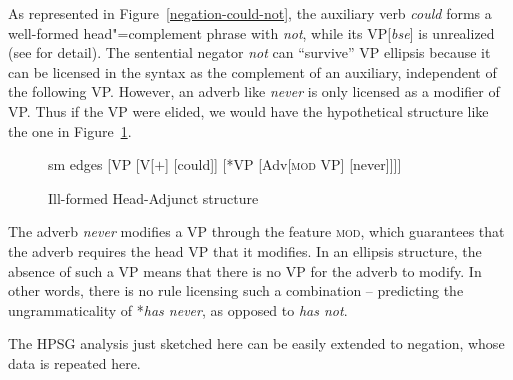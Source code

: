 \documentclass[output=paper,biblatex,babelshorthands,newtxmath,draftmode,colorlinks,citecolor=brown]{langscibook}
\begin{document}
\begin{exe}
\begin{xlist}
\begin{exe}
\begin{xlist}
As represented in Figure~\ref{negation-could-not}, the auxiliary verb \textit{could} forms a well-formed head"=complement phrase with \textit{not}, while its
VP[\textit{bse}] is unrealized (see \citealt{Kim:00, KS:08} for
detail). The sentential negator \textit{not} can ``survive'' VP ellipsis because it can be
licensed in the syntax as the complement of an auxiliary, independent
of the following VP.  However, an adverb like \textit{never} is only
licensed as a modifier of VP. Thus if the VP were elided, we would have the hypothetical
structure like the one in Figure~\ref{negation-fig-could-never}.
\begin{figure}
	\begin{forest}
		sm edges
		[VP
			[V{[\aux $+$]}
				[could]]
			[*VP
				[Adv{[\textsc{mod} VP]}
					[never]]]]
	\end{forest}
\caption{Ill-formed Head-Adjunct structure}\label{negation-fig-could-never}
\end{figure}
\largerpage
The adverb \textit{never} modifies a VP through the feature \textsc{mod},
which guarantees that the adverb requires the head VP that it
modifies. In an ellipsis structure, the absence of such a VP means
that there is no VP for the adverb to modify.  In other words, there
is no rule licensing such a combination -- predicting the
ungrammaticality of *\textit{has never},  as opposed to \textit{has not}.


The HPSG analysis just sketched here can be easily extended to  negation, whose
data is repeated here.

\eal
{}
\zl


\end{xlist}
\end{exe}
\end{xlist}
\end{exe}
\end{document}
